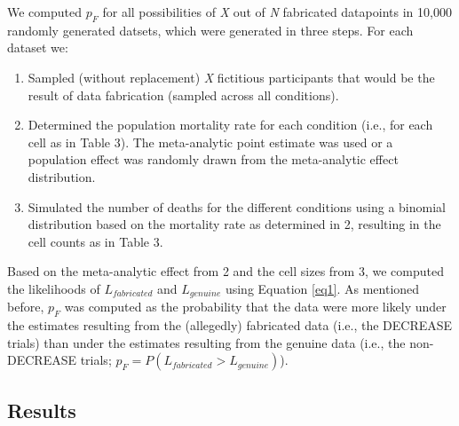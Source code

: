 \documentclass[]{article}
\begin{document}
We computed \(p_F\) for all possibilities of \emph{X} out of \emph{N}
fabricated datapoints in 10,000 randomly generated datsets, which were
generated in three steps. For each dataset we:

\begin{enumerate}
\def\labelenumi{\arabic{enumi}.}
\item
  Sampled (without replacement) \emph{X} fictitious participants that
  would be the result of data fabrication (sampled across all
  conditions).
\item
  Determined the population mortality rate for each condition (i.e., for
  each cell as in Table 3). The meta-analytic point estimate was used or
  a population effect was randomly drawn from the meta-analytic effect
  distribution.
\item
  Simulated the number of deaths for the different conditions using a
  binomial distribution based on the mortality rate as determined in 2,
  resulting in the cell counts as in Table 3.
\end{enumerate}

Based on the meta-analytic effect from 2 and the cell sizes from 3, we
computed the likelihoods of \(L_{fabricated}\) and \(L_{genuine}\) using
Equation \ref{eq1}. As mentioned before, \(p_F\) was computed as the
probability that the data were more likely under the estimates resulting
from the (allegedly) fabricated data (i.e., the DECREASE trials) than
under the estimates resulting from the genuine data (i.e., the
non-DECREASE trials; \(p_F=P(L_{fabricated}>L_{genuine})\)).

\subsection{Results}\label{results-2}
\end{document}
